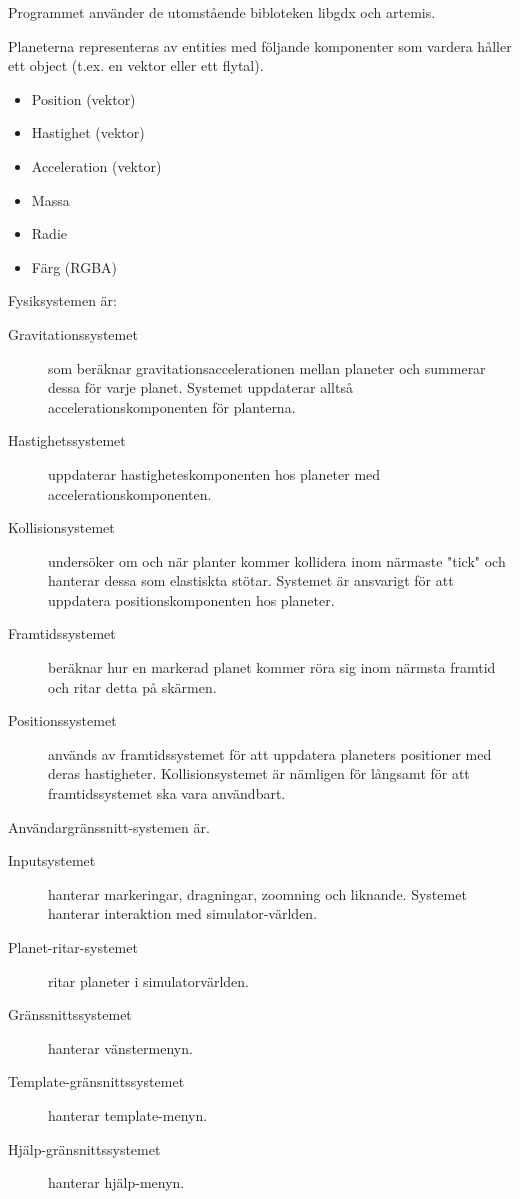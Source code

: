 Programmet använder de utomstående bibloteken libgdx och artemis.

Planeterna representeras av entities med följande komponenter
som vardera håller ett object (t.ex. en vektor eller ett flytal).
\begin{itemize}
    \item Position (vektor)
    \item Hastighet (vektor)
    \item Acceleration (vektor)
    \item Massa
    \item Radie
    \item Färg (RGBA)
\end{itemize}

\vspace{6pt}

Fysiksystemen är:
\begin{description}
    \item[Gravitationssystemet] som beräknar gravitationsaccelerationen mellan planeter
        och summerar dessa för varje planet.
        Systemet uppdaterar alltså accelerationskomponenten för planterna.
    \item[Hastighetssystemet] uppdaterar hastigheteskomponenten hos
        planeter med accelerationskomponenten.
    \item[Kollisionsystemet] undersöker om och när planter kommer kollidera
        inom närmaste "tick" och hanterar dessa som elastiskta stötar.
        Systemet är ansvarigt för att uppdatera positionskomponenten
        hos planeter.
    \item[Framtidssystemet] beräknar hur en markerad planet
        kommer röra sig inom närmsta framtid och ritar detta på skärmen.
    \item[Positionssystemet] används av framtidssystemet för att uppdatera
        planeters positioner med deras hastigheter. Kollisionsystemet
        är nämligen för långsamt för att framtidssystemet ska
        vara användbart.
\end{description}

\vspace{6pt}

Användargränssnitt-systemen är.
\begin{description}
    \item[Inputsystemet] hanterar markeringar, dragningar,
        zoomning och liknande.
        Systemet hanterar interaktion med simulator-världen.
    \item[Planet-ritar-systemet] ritar planeter i simulatorvärlden.
    \item[Gränssnittssystemet] hanterar vänstermenyn.
    \item[Template-gränsnittssystemet] hanterar template-menyn.
    \item[Hjälp-gränsnittssystemet] hanterar hjälp-menyn.
\end{description}

